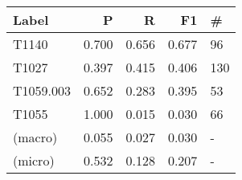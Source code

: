 \begin{tabular}{lrrrl}
    \toprule
    Label     & P     & R     & F1    & \#  \\
    \midrule
    T1140     & 0.700 & 0.656 & 0.677 & 96  \\
    T1027     & 0.397 & 0.415 & 0.406 & 130 \\
    T1059.003 & 0.652 & 0.283 & 0.395 & 53  \\
    T1055     & 1.000 & 0.015 & 0.030 & 66 \\
    (macro)   & 0.055 & 0.027 & 0.030 & - \\
    (micro)   & 0.532 & 0.128 & 0.207 & -   \\
    \bottomrule
\end{tabular}
